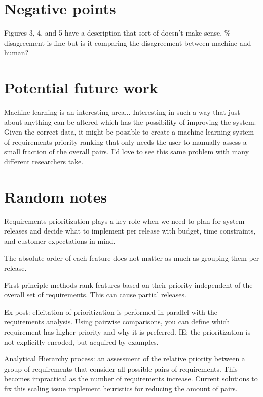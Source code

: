 \documentclass[11pt,twoside]{IEEEtran}
\begin{document}
\section{Negative points}

Figures 3, 4, and 5 have a description that sort of doesn't make sense. \% disagreement is fine but is it comparing the disagreement between machine and human?

\section{Potential future work}

Machine learning is an interesting area... Interesting in such a way that just about anything can be altered which has the possibility of improving the system. Given the correct data, it might be possible to create a machine learning system of requirements priority ranking that only needs the user to manually assess a small fraction of the overall pairs. I'd love to see this same problem with many different researchers take.

\section{Random notes}
Requirements prioritization plays a key role when we need to plan for system releases and decide what to implement per release with budget, time constraints, and customer expectations in mind.

The absolute order of each feature does not matter as much as grouping them per release.

First principle methods rank features based on their priority independent of the overall set of requirements. This can cause partial releases.

Ex-post: elicitation of prioritization is performed in parallel with the requirements analysis. Using pairwise comparisons, you can define which requirement has higher priority and why it is preferred. IE: the prioritization is not explicitly encoded, but acquired by examples.

Analytical Hierarchy process: an assessment of the relative priority between a group of requirements that consider all possible pairs of requirements. This becomes impractical as the number of requirements increase. Current solutions to fix this scaling issue implement heuristics for reducing the amount of pairs.
\end{document}
